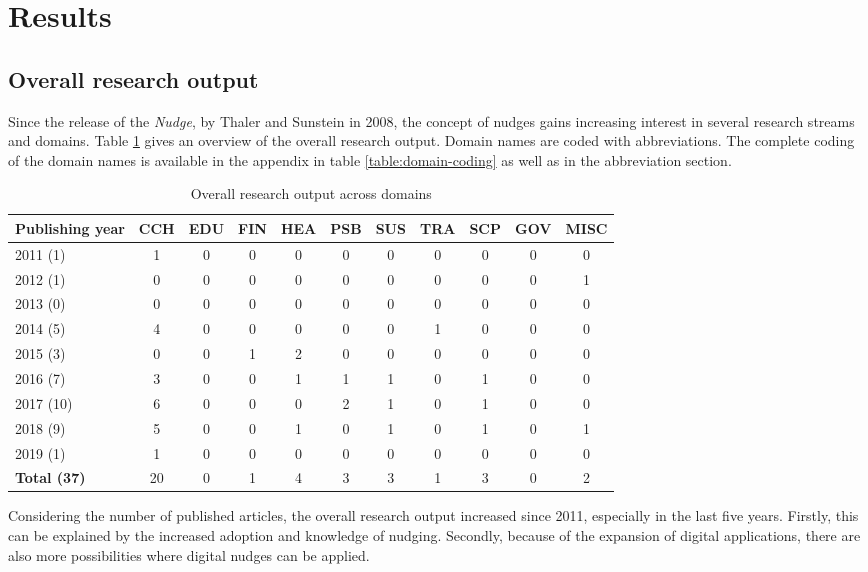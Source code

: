 \section{Results}

\subsection{Overall research output}
Since the release of the \textit{Nudge}, by Thaler and Sunstein in 2008, the concept of nudges gains increasing interest in several research streams and domains. Table \ref{table:research-output} gives an overview of the overall research output. Domain names are coded with abbreviations. The complete coding of the domain names is available in the appendix in table \ref{table:domain-coding} as well as in the abbreviation section.

\begin{table}[htbp]
\centering
\small
\begin{tabular}{|l|cccccccccc|}
\hline
\textbf{Publishing year} & \textbf{CCH} & \textbf{EDU} & \textbf{FIN} & \textbf{HEA} & \textbf{PSB} & \textbf{SUS} & \textbf{TRA} & \textbf{SCP} & \textbf{GOV} & \textbf{MISC} \\ \hline
2011 (1) & 1 & 0 & 0 & 0 & 0 & 0 & 0 & 0 & 0 &  0 \\
2012 (1) & 0 & 0 & 0 & 0 & 0 & 0 & 0 & 0 & 0 & 1 \\
2013 (0) & 0 & 0 & 0 & 0 & 0 & 0 & 0 & 0 & 0 & 0 \\
2014 (5) & 4 & 0 & 0 & 0 & 0 & 0 & 1 & 0 & 0 & 0 \\
2015 (3) & 0 & 0 & 1 & 2 & 0 & 0 & 0 & 0 & 0 & 0 \\
2016 (7) & 3 & 0 & 0 & 1 & 1 & 1 & 0 & 1 & 0 & 0 \\
2017 (10) & 6 & 0 & 0 & 0 & 2 & 1 & 0 & 1 & 0 & 0 \\
2018 (9) & 5 & 0 & 0 & 1 & 0 & 1 & 0 & 1 & 0 & 1 \\
2019 (1) & 1 & 0 & 0 & 0 & 0 & 0 & 0 & 0 & 0 & 0 \\ \hline
\textbf{Total (37)} & 20 & 0 & 1 & 4 & 3 & 3 & 1 & 3 & 0 & 2 \\ \hline
\end{tabular}
\caption{Overall research output across domains}
\label{table:research-output}
\end{table}

Considering the number of published articles, the overall research output increased since 2011, especially in the last five years. Firstly, this can be explained by the increased adoption and knowledge of nudging. Secondly, because of the expansion of digital applications, there are also more possibilities where digital nudges can be applied.
\\

